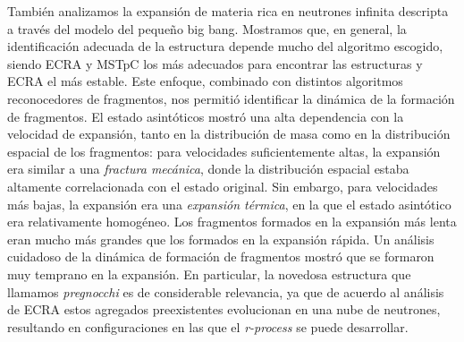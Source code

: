 También analizamos la expansión de materia rica en neutrones infinita descripta a través del modelo del pequeño big bang.
Mostramos que, en general, la identificación adecuada de la estructura depende mucho del algoritmo escogido, siendo ECRA y MSTpC los más adecuados para encontrar las estructuras y ECRA el más estable.
Este enfoque, combinado con distintos algoritmos reconocedores de fragmentos, nos permitió identificar la dinámica de la formación de fragmentos.
El estado asintóticos mostró una alta dependencia con la velocidad de expansión, tanto en la distribución de masa como en la distribución espacial de los fragmentos: para velocidades suficientemente altas, la expansión era similar a una \emph{fractura mecánica}, donde la distribución espacial estaba altamente correlacionada con el estado original.
Sin embargo, para velocidades más bajas, la expansión era una \emph{expansión térmica}, en la que el estado asintótico era relativamente homogéneo.
Los fragmentos formados en la expansión más lenta eran mucho más grandes que los formados en la expansión rápida.
Un análisis cuidadoso de la dinámica de formación de fragmentos mostró que se formaron muy temprano en la expansión.
En particular, la novedosa estructura que llamamos \emph{pregnocchi}
es de considerable relevancia, ya que de acuerdo al análisis de ECRA
estos agregados preexistentes evolucionan en una nube de neutrones,
resultando en configuraciones en las que el \emph{r-process} se puede
desarrollar.
